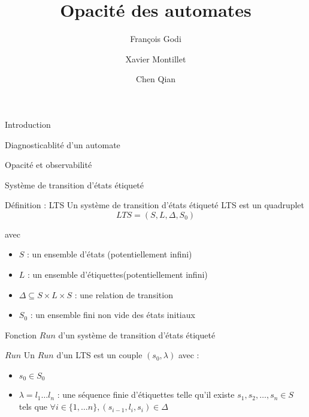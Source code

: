 \documentclass[11pt]{beamer}
\author{François Godi \and Xavier Montillet \and Chen Qian}
\title{Opacit\'e des automates}
\begin{document}
\begin{frame}
\titlepage
\end{frame}

\begin{frame}
\tableofcontents
\end{frame}

\begin{section}{Introduction}
 
 
\end{section}


\begin{section}{Diagnosticablit\'e d'un automate}

\end{section}

\begin{section}{Opacit\'e et observabilit\'e}
  \begin{frame}{Système de transition d'états étiqueté}
    \begin{block}{D\'efinition : LTS}
      Un système de transition d'états étiqueté LTS est un quadruplet
      $$LTS = (S,L,\Delta,S_0)$$
      
      avec
	\begin{itemize}
	  \item $S$ : un ensemble d'\'etats (potentiellement infini)
	  \item $L$ : un ensemble d'étiquettes(potentiellement infini)
	  \item $\Delta \subseteq S\times L \times S$ : une relation de transition
	  \item $S_0$ : un ensemble fini non vide des \'etats initiaux 
	\end{itemize}
      
    \end{block}
  \end{frame}

  \begin{frame}{Fonction $Run$ d'un syst\`eme de transition d'\'etats \'etiquet\'e}
    \begin{block}{$Run$}
      Un $Run$ d'un LTS est un couple $(s_0,\lambda)$ avec :

	\begin{itemize}
	  \item $s_0 \in S_0$
	  \item $\lambda = l_1 \dots l_n$ : une s\'equence finie d'\'etiquettes telle qu'il existe $s_1,s_2,\dots ,s_n \in S$ tels que $\forall i \in \{1, \dots n\}, (s_{i-1},l_i,s_i) \in \Delta$ 
	\end{itemize}


\end{block}
\end{frame}
\end{section}
\end{document}

